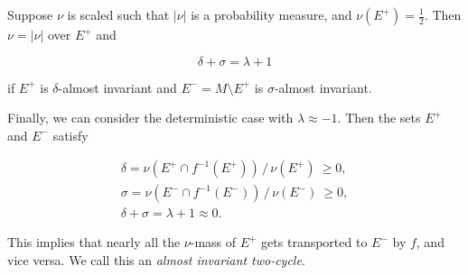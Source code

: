 \begin{theorem}
    \label{thm:almost}
    \cite*{attr}
    Suppose $\nu$ is scaled such that $| \nu |$ is a probability measure, and 
    $\nu (E^+) = \frac{1}{2}$. Then $\nu = | \nu |$ over $E^+$ and 

    \begin{equation}
        \delta + \sigma = \lambda + 1
    \end{equation}

    if $E^+$ is $\delta$-almost invariant and $E^- = M \setminus E^+$ is $\sigma$-almost 
    invariant.
\end{theorem}

\begin{example}
    \label{ex:almost}
    Finally, we can consider the deterministic case with $\lambda \approx -1$. Then the sets 
    $E^+$ and $E^-$ satisfy
    
    \begin{gather}
        \delta = \nu (E^+ \cap f^{-1} (E^+))\, /\, \nu (E^+)\ \geq 0, \\
        \sigma = \nu (E^- \cap f^{-1} (E^-))\, /\, \nu (E^-)\ \geq 0, \\
        \delta + \sigma = \lambda + 1 \approx 0.
    \end{gather}
    
    This implies that nearly all the $\nu$-mass of $E^+$ gets transported to $E^-$ by $f$, 
    and vice versa. We call this an \emph{almost invariant two-cycle}.     
\end{example} 



